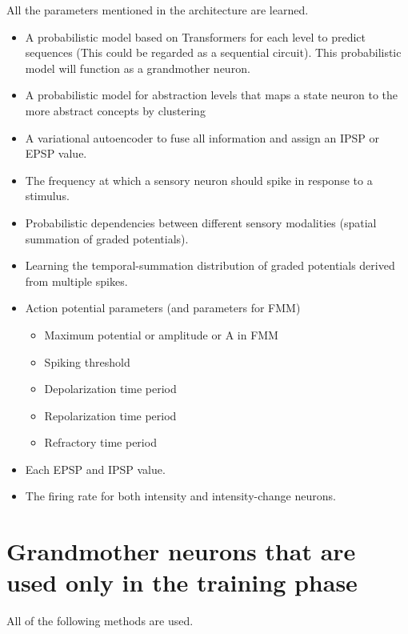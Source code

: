 \documentclass[a4paper]{article}
\begin{document}
      All the parameters mentioned in the architecture are learned.
      \begin{itemize}

         \item A probabilistic model based on Transformers for each level to predict sequences (This could be regarded as a sequential circuit). This probabilistic model will function as a grandmother neuron.

         \item A probabilistic model for abstraction levels that maps a state neuron to the more abstract concepts by clustering

         \item A variational autoencoder to fuse all information and assign an IPSP or EPSP value.

         \item The frequency at which a sensory neuron should spike in response to a stimulus.

         \item Probabilistic dependencies between different sensory modalities (spatial summation of graded potentials).

         \item Learning the temporal-summation distribution of graded potentials derived from multiple spikes.

         \item Action potential parameters (and parameters for FMM)

         \begin{itemize}
            \item Maximum potential or amplitude or A in FMM
            \item Spiking threshold
            \item Depolarization time period
            \item Repolarization time period
            \item Refractory time period
         \end{itemize}

         \item Each EPSP and IPSP value.

         \item The firing rate for both intensity and intensity-change neurons.

      \end{itemize}

   \section{Grandmother neurons that are used only in the training phase}
      All of the following methods are used.
\end{document}
